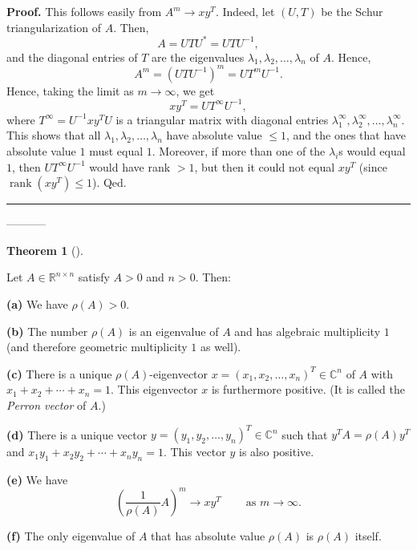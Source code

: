 \documentclass[numbers=enddot,12pt,final,onecolumn,notitlepage]{scrartcl}%
\numberwithin{exer}{subsection}
\theoremstyle{definition}
\newtheorem{theo}{Theorem}[subsection]
\newenvironment{theorem}[1][]
{\begin{theo}[#1]\begin{leftbar}}
{\end{leftbar}\end{theo}}
\newenvironment{proof}[1][Proof]{\noindent\textbf{#1.} }{\ \rule{0.5em}{0.5em}}
\begin{document}
\begin{proof}
This follows easily from $A^{m}\rightarrow xy^{T}$. Indeed, let $\left(
U,T\right)  $ be the Schur triangularization of $A$. Then,
\[
A=UTU^{\ast}=UTU^{-1},
\]
and the diagonal entries of $T$ are the eigenvalues $\lambda_{1},\lambda
_{2},\ldots,\lambda_{n}$ of $A$. Hence,%
\[
A^{m}=\left(  UTU^{-1}\right)  ^{m}=UT^{m}U^{-1}.
\]
Hence, taking the limit as $m\rightarrow\infty$, we get%
\[
xy^{T}=UT^{\infty}U^{-1},
\]
where $T^{\infty}=U^{-1}xy^{T}U$ is a triangular matrix with diagonal entries
$\lambda_{1}^{\infty},\lambda_{2}^{\infty},\ldots,\lambda_{n}^{\infty}$. This
shows that all $\lambda_{1},\lambda_{2},\ldots,\lambda_{n}$ have absolute
value $\leq1$, and the ones that have absolute value $1$ must equal $1$.
Moreover, if more than one of the $\lambda_{i}$s would equal $1$, then
$UT^{\infty}U^{-1}$ would have rank $>1$, but then it could not equal $xy^{T}$
(since $\operatorname*{rank}\left(  xy^{T}\right)  \leq1$). Qed.
\end{proof}

-----------

\begin{theorem}
[Perron theorem]\label{thm.posmat.perron}Let $A\in\mathbb{R}^{n\times n}$
satisfy $A>0$ and $n>0$. Then: \medskip

\textbf{(a)} We have $\rho\left(  A\right)  >0$. \medskip

\textbf{(b)} The number $\rho\left(  A\right)  $ is an eigenvalue of $A$ and
has algebraic multiplicity $1$ (and therefore geometric multiplicity $1$ as
well). \medskip

\textbf{(c)} There is a unique $\rho\left(  A\right)  $-eigenvector $x=\left(
x_{1},x_{2},\ldots,x_{n}\right)  ^{T}\in\mathbb{C}^{n}$ of $A$ with
$x_{1}+x_{2}+\cdots+x_{n}=1$. This eigenvector $x$ is furthermore positive.
(It is called the \emph{Perron vector} of $A$.) \medskip

\textbf{(d)} There is a unique vector $y=\left(  y_{1},y_{2},\ldots
,y_{n}\right)  ^{T}\in\mathbb{C}^{n}$ such that $y^{T}A=\rho\left(  A\right)
y^{T}$ and $x_{1}y_{1}+x_{2}y_{2}+\cdots+x_{n}y_{n}=1$. This vector $y$ is
also positive. \medskip

\textbf{(e)} We have%
\[
\left(  \dfrac{1}{\rho\left(  A\right)  }A\right)  ^{m}\rightarrow
xy^{T}\ \ \ \ \ \ \ \ \ \ \text{as }m\rightarrow\infty.
\]


\textbf{(f)} The only eigenvalue of $A$ that has absolute value $\rho\left(
A\right)  $ is $\rho\left(  A\right)  $ itself.
\end{theorem}
\end{document}
